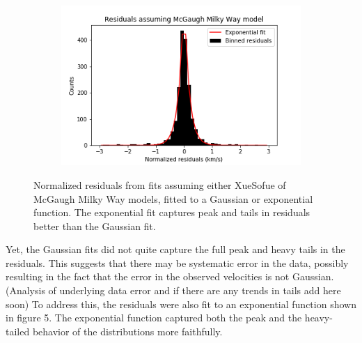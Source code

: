 \documentclass[reprint,%
 amsmath,amssymb,
 aps,
]{revtex4-1}
\begin{document}
\begin{figure}[h]
\begin{subfigure}[b]{0.475\textwidth}
         \label{fig:XueSofue residuals exponential fit}
     \end{subfigure}
     \begin{subfigure}[b]{0.475\textwidth}
         \centering
         \includegraphics[width=.8\linewidth]{figures/ResidualHist_ExpFit_v1_sinh_v2_cosh_McGaugh.png}
         \label{fig:McGaugh residuals exponential fit}
     \end{subfigure}
        \caption{Normalized residuals from fits assuming either XueSofue of McGaugh Milky Way models, fitted to a Gaussian or exponential function. The exponential fit captures peak and tails in residuals better than the Gaussian fit.}
        \label{fig:residual graphs}
\end{figure}
Yet, the Gaussian fits did not quite capture the full peak and heavy tails in the residuals. This suggests that there may be systematic error in the data, possibly resulting in the fact that the error in the observed velocities is not Gaussian. (Analysis of underlying data error and if there are any trends in tails add here soon) To address this, the residuals were also fit to an exponential function shown in figure 5. The exponential function captured both the peak and the heavy-tailed behavior of the distributions more faithfully.

\end{document}
